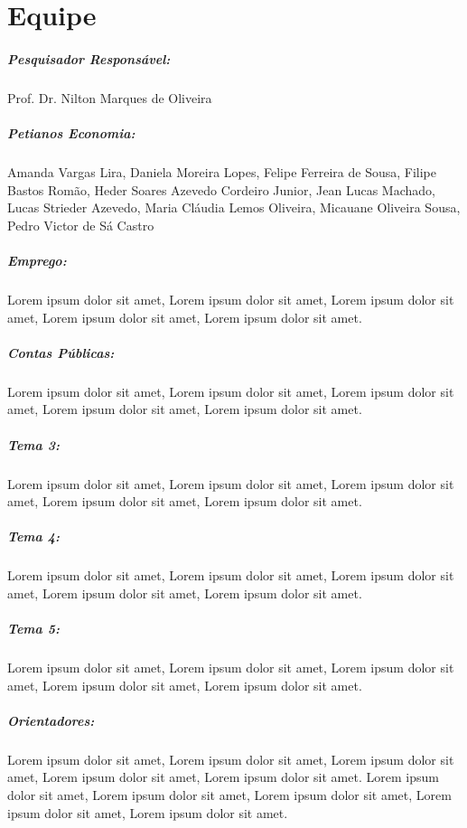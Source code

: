 \chapter*{Equipe}
  \begin{center}
    \parbox{0.7\linewidth}{
      \paragraph{Pesquisador Responsável:}
        Prof. Dr. Nilton Marques de Oliveira
      \paragraph{Petianos Economia:}
        Amanda Vargas Lira, Daniela Moreira Lopes, Felipe Ferreira de Sousa, Filipe Bastos Romão, Heder Soares Azevedo Cordeiro Junior, Jean Lucas Machado, Lucas Strieder Azevedo, Maria Cláudia Lemos Oliveira, Micauane Oliveira Sousa, Pedro Victor de Sá Castro
      \paragraph{Emprego:}
        Lorem ipsum dolor sit amet, Lorem ipsum dolor sit amet, Lorem ipsum dolor sit amet, Lorem ipsum dolor sit amet, Lorem ipsum dolor sit amet.
      \paragraph{Contas Públicas:}
        Lorem ipsum dolor sit amet, Lorem ipsum dolor sit amet, Lorem ipsum dolor sit amet, Lorem ipsum dolor sit amet, Lorem ipsum dolor sit amet.
      \paragraph{Tema 3:}
        Lorem ipsum dolor sit amet, Lorem ipsum dolor sit amet, Lorem ipsum dolor sit amet, Lorem ipsum dolor sit amet, Lorem ipsum dolor sit amet.
      \paragraph{Tema 4:}
        Lorem ipsum dolor sit amet, Lorem ipsum dolor sit amet, Lorem ipsum dolor sit amet, Lorem ipsum dolor sit amet, Lorem ipsum dolor sit amet.
      \paragraph{Tema 5:}
        Lorem ipsum dolor sit amet, Lorem ipsum dolor sit amet, Lorem ipsum dolor sit amet, Lorem ipsum dolor sit amet, Lorem ipsum dolor sit amet.
      \paragraph{Orientadores:}
        Lorem ipsum dolor sit amet, Lorem ipsum dolor sit amet, Lorem ipsum dolor sit amet, Lorem ipsum dolor sit amet, Lorem ipsum dolor sit amet. Lorem ipsum dolor sit amet, Lorem ipsum dolor sit amet, Lorem ipsum dolor sit amet, Lorem ipsum dolor sit amet, Lorem ipsum dolor sit amet.
    }
  \end{center}
